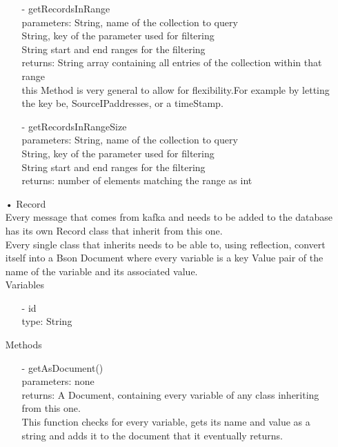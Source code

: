 \documentclass[oneside, english, final]{design}
\begin{document}
\begin{itemize}
\begin{itemize}
		      \item[-]getRecordsInRange
		            \\parameters: String, name of the collection to query
		            \\String, key of the parameter used for filtering
		            \\String start and end ranges for the filtering
		            \\returns: String array containing all entries of the collection within that range
		            \\this Method is very general to allow for flexibility.For example by letting the key be, SourceIPaddresses, or a timeStamp.

		      \item[-]getRecordsInRangeSize
		            \\parameters: String, name of the collection to query
		            \\String, key of the parameter used for filtering
		            \\String start and end ranges for the filtering
		            \\returns: number of elements matching the range as int


	      \end{itemize}

	\item[•]Record
	      \\Every message that comes from kafka and needs to be added to the database has its own Record class that inherit from this one.
	      \\Every single class that inherits needs to be able to, using reflection, convert itself into a Bson Document where every variable is a key Value pair of the name of the variable and its associated value.
	      \\Variables
	      \begin{itemize}
		      \item[-] id
		            \\type: String
	      \end{itemize}
	      Methods
	      \begin{itemize}
		      \item[-]getAsDocument()
		            \\parameters: none
		            \\returns: A Document, containing every variable of any class inheriting from this one.
		            \\This function checks for every variable, gets its name and value as a string and adds it to the document that it eventually returns.
	      \end{itemize}


\end{itemize}
\end{document}
